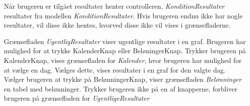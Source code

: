 \noindent 
Når brugeren er tilgået resultater henter controlleren, \textit{KonditionResultater} resultater fra modellen \textit{KonditionResultater}.  Hvis brugeren endnu ikke har nogle resultater, vil disse ikke hentes, hvorved disse ikke vil vises i grænsefladerne. 

Grænsefladen \textit{UgentligResultater} viser ugentlige resultater i en graf.  Brugeren har mulighed for at trykke KalenderKnap eller BeløningerKnap. Trykker brugeren på KalenderKnap, vises grænsefladen for \textit{Kalender}, hvor brugeren har mulighed for at vælge en dag. Vælges dette, vises resultater i en graf for den valgte dag. Vælger brugeren at trykke på BelønningerKnap, viser grænsefladen \textit{Belønninger} en tabel med belønninger. Trykker brugeren ikke på en af knapperne, forbliver brugeren på grænsefladen for \textit{UgentligeResultater}

